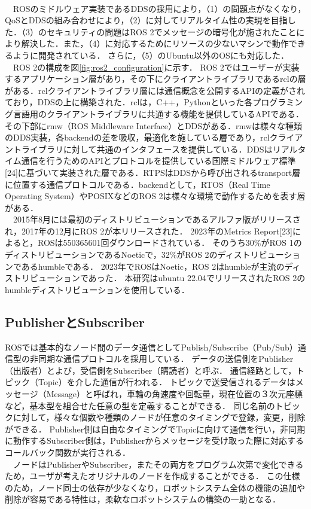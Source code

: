 \\　ROSのミドルウェア実装であるDDSの採用により，（1）の問題点がなくなり，QoSとDDSの組み合わせにより，（2）に対してリアルタイム性の実現を目指した．（3）のセキュリティの問題はROS 2でメッセージの暗号化が施されたことにより解決した．また，（4）に対応するためにリソースの少ないマシンで動作できるように開発されている．
さらに，（5）のUbuntu以外のOSにも対応した．
\\　ROS 2の構成を図\ref{fig:ros2_configuration}に示す．
ROS 2ではユーザーが実装するアプリケーション層があり，その下にクライアントライブラリであるrclの層がある．rclクライアントライブラリ層には通信概念を公開するAPIの定義がされており，DDSの上に構築された．rclは，C++，Pythonといった各プログラミング言語用のクライアントライブラリに共通する機能を提供しているAPIである．その下部にrmw（ROS Middleware Interface）とDDSがある．rmwは様々な種類のDDS実装，各backendの差を吸収，最適化を施している層であり，rclクライアントライブラリに対して共通のインタフェースを提供している．DDSはリアルタイム通信を行うためのAPIとプロトコルを提供している国際ミドルウェア標準[24]に基づいて実装された層である．RTPSはDDSから呼び出されるtransport層に位置する通信プロトコルである．backendとして，RTOS（Real Time Operating System）やPOSIXなどのROS 2は様々な環境で動作するためを表す層がある．
\\　2015年8月には最初のディストリビューションであるアルファ版がリリースされ，2017年の12月にROS 2が本リリースされた．
2023年のMetrics Report[23]によると，ROSは550365601回ダウンロードされている．
そのうち30\%がROS 1のディストリビューションであるNoeticで，32\%がROS 2のディストリビューションであるhumbleである．
2023年でROSはNoetic，ROS 2はhumbleが主流のディストリビューションであった．
本研究はubuntu 22.04でリリースされたROS 2のhumbleディストリビューションを使用している．
\subsection{PublisherとSubscriber}
ROSでは基本的なノード間のデータ通信としてPublish/Subscribe（Pub/Sub）通信型の非同期な通信プロトコルを採用している．
データの送信側をPublisher（出版者）とよび，受信側をSubscriber（購読者）と呼ぶ．
通信経路として，トピック（Topic）を介した通信が行われる．
トピックで送受信されるデータはメッセージ（Message）と呼ばれ，車輪の角速度や回転量，現在位置の３次元座標など，基本型を組合せた任意の型を定義することができる．
同じ名前のトピックに対して，様々な個数や種類のノードが任意のタイミングで登録，変更，削除ができる．
Publisher側は自由なタイミングでTopicに向けて通信を行い，非同期に動作するSubscriber側は，Publisherからメッセージを受け取った際に対応するコールバック関数が実行される．
\\　ノードはPublisherやSubscriber，またその両方をプログラム次第で変化できるため，ユーザが考えたオリジナルのノードを作成することができる．
この仕様のため，ノード同士の依存が少なくなり，ロボットシステム全体の機能の追加や削除が容易である特性は，柔軟なロボットシステムの構築の一助となる．
